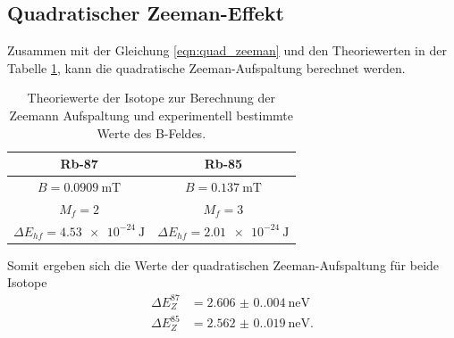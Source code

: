 \subsection{Quadratischer Zeeman-Effekt}
\label{sec:quadratischer-zeeman-effekt}

Zusammen mit der Gleichung \ref{eqn:quad_zeeman} und den Theoriewerten in der Tabelle \ref{tab:zee}, kann die
quadratische Zeeman-Aufspaltung berechnet werden.

\begin{table}
    \centering
    \caption{Theoriewerte der Isotope zur Berechnung der Zeemann Aufspaltung und experimentell bestimmte Werte des B-Feldes. \cite{pumpen}}
    \label{tab:zee}
    \begin{tabular}{c c}
        \toprule
        Rb-87 & Rb-85\\
        \midrule
        $B = \qty{0.0909}{\milli\tesla}$ & $B = \qty{0.137}{\milli\tesla}$ \\
        $M_f = 2$ & $M_f = 3$ \\
        $\Delta E_{hf} = \qty{4.53e-24}{\joule} $ & $\Delta E_{hf} = \qty{2.01e-24}{\joule} $ \\
        \bottomrule
    \end{tabular}
\end{table}

Somit ergeben sich die Werte der quadratischen Zeeman-Aufspaltung für beide Isotope
\begin{align}
    \Delta E_Z^{87} &= \qty{2.606(0.004)}{\nano\eV} \\
    \Delta E_Z^{85} &= \qty{2.562(0.019)}{\nano\eV} .
\end{align}